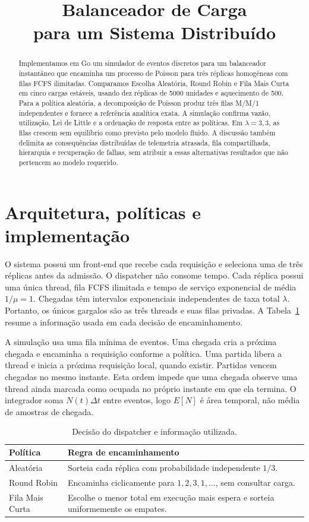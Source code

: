 \documentclass[conference]{IEEEtran}
\title{Balanceador de Carga\\
para um Sistema Distribuído}
\author{\IEEEauthorblockN{Rodrigo Camargo \quad André Loubet}
\IEEEauthorblockA{RA 238257 \quad RA 253333\\
MC714, Sistemas Distribuídos, Universidade Estadual de Campinas}}
\begin{document}
\maketitle

\begin{abstract}
Implementamos em Go um simulador de eventos discretos para um balanceador instantâneo que encaminha um processo de Poisson para três réplicas homogêneas com filas FCFS ilimitadas. Comparamos Escolha Aleatória, Round Robin e Fila Mais Curta em cinco cargas estáveis, usando dez réplicas de 5000 unidades e aquecimento de 500. Para a política aleatória, a decomposição de Poisson produz três filas M/M/1 independentes e fornece a referência analítica exata. A simulação confirma vazão, utilização, Lei de Little e a ordenação de resposta entre as políticas. Em $\lambda=3{,}3$, as filas crescem sem equilíbrio como previsto pelo modelo fluido. A discussão também delimita as consequências distribuídas de telemetria atrasada, fila compartilhada, hierarquia e recuperação de falhas, sem atribuir a essas alternativas resultados que não pertencem ao modelo requerido.
\end{abstract}

\section{Arquitetura, políticas e implementação}
O sistema possui um front-end que recebe cada requisição e seleciona uma de três réplicas antes da admissão. O dispatcher não consome tempo. Cada réplica possui uma única thread, fila FCFS ilimitada e tempo de serviço exponencial de média $1/\mu=1$. Chegadas têm intervalos exponenciais independentes de taxa total $\lambda$. Portanto, os únicos gargalos são as três threads e suas filas privadas. A Tabela~\ref{tab:policies} resume a informação usada em cada decisão de encaminhamento.

A simulação usa uma fila mínima de eventos. Uma chegada cria a próxima chegada e encaminha a requisição conforme a política. Uma partida libera a thread e inicia a próxima requisição local, quando existir. Partidas vencem chegadas no mesmo instante. Esta ordem impede que uma chegada observe uma thread ainda marcada como ocupada no próprio instante em que ela termina. O integrador soma $N(t)\Delta t$ entre eventos, logo $E[N]$ é área temporal, não média de amostras de chegada.

\begin{table}[H]
\caption{Decisão do dispatcher e informação utilizada.}
\label{tab:policies}
\centering
\scriptsize
\begin{tabular}{p{}p{}}
\toprule
Política & Regra de encaminhamento \\
\midrule
Aleatória & Sorteia cada réplica com probabilidade independente $1/3$. \\
Round Robin & Encaminha ciclicamente para $1,2,3,1,\ldots$, sem consultar carga. \\
Fila Mais Curta & Escolhe o menor total em execução mais espera e sorteia uniformemente os empates. \\
\bottomrule
\end{tabular}
\end{table}
\end{document}
